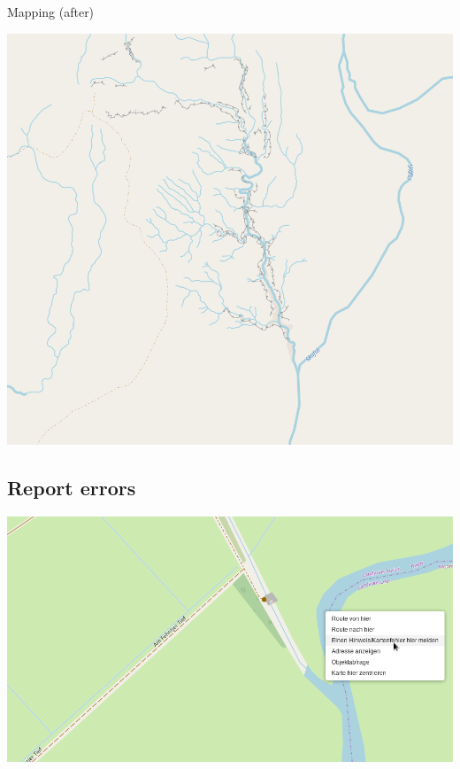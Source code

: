 \documentclass{beamer}
\begin{document}
	\begin{frame}{Mapping (after)}
		\begin{center}
			\includegraphics[height=0.9\textheight,keepaspectratio]{images/osm-uxatindar-river-1}
		\end{center}
	\end{frame}
	
	\subsection{Report errors}
	
	\begin{frame}
		\begin{center}
			\includegraphics[width=\linewidth,height=\textheight,keepaspectratio]{images/report-error-menu}
		\end{center}
	\end{frame}
	
\end{document}

